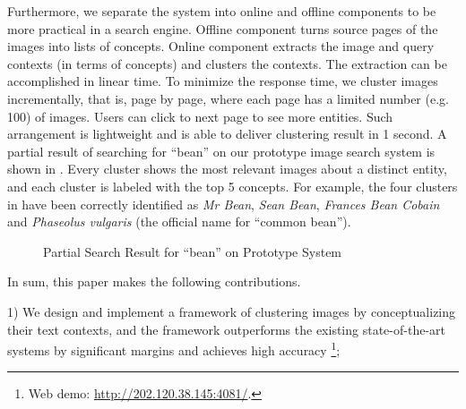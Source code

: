 Furthermore, we separate the system into online and offline
components to be more practical in a search engine.
Offline component turns source pages of the images into lists of
concepts. Online component extracts the image and query contexts (in terms of
concepts) and clusters the contexts.
The extraction can be accomplished in linear time.
To minimize the response time, we cluster images incrementally, that is,
page by page, where each page has a limited number
(e.g. 100) of images. Users can click to next page to see more entities.
Such arrangement is lightweight and is
able to deliver clustering result in 1 second.
A partial result of searching for ``bean'' on our prototype image search system
is shown in .
Every cluster shows the
most relevant images about a distinct entity, and each cluster is labeled with
the top 5 concepts. For example,
the four clusters in  have been correctly identified
as {\em Mr Bean}, {\em Sean Bean}, {\em Frances Bean Cobain} and
{\em Phaseolus vulgaris}
(the official name for ``common bean'').

\begin{figure}[th]
\centerline{}
\caption{Partial Search Result for ``bean'' on Prototype System}
\label{fig:demo-bean}
\end{figure}

In sum, this paper makes the following contributions.

1) We design and implement a framework of clustering images by
conceptualizing their text contexts, and the framework
outperforms the existing state-of-the-art systems by significant margins
and achieves high accuracy
\footnote{Web demo: \url{http://202.120.38.145:4081/}.};


